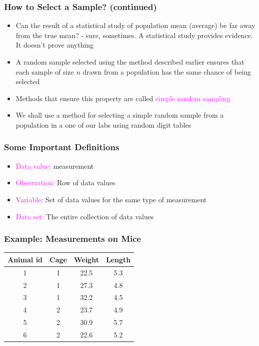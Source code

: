 \documentclass[xcolor=dvipsnames,12pt]{beamer}
\begin{document}
\begin{frame}
\frametitle{How to Select a Sample? (continued)}
\begin{itemize}
\item Can the result of a statistical study of population mean
(average) be far away from the true mean?  - sure, sometimes. 
A statistical study provides evidence.  It doesn't prove anything\\
\item A random sample selected using the method described earlier 
ensures that each sample of size $n$ drawn from a population has 
the same chance of being selected
\item Methods that ensure this property are called \textcolor{magenta}{simple  random 
sampling}
\item We shall use a method for selecting a simple  random 
sample from a population in a one of our labs using random digit tables
\end{itemize}
\end{frame}


\begin{frame}
\frametitle{Some Important Definitions}
\begin{itemize}
\item  \textcolor{magenta}{Data value:} measurement
\item \textcolor{magenta}{Observation:} Row of data values
\item \textcolor{magenta}{Variable:} Set of data values for the same type of measurement
\item \textcolor{magenta}{Data set:} The entire collection of data values
\end{itemize}
\end{frame}

\begin{frame}
\frametitle{Example: Measurements on Mice}
\begin{tabular}{|c|c|c|c|}
\hline
Animal id & Cage & Weight & Length \\ \hline
1  & 1  & 22.5  & 5.3  \\ \hline
2  & 1  & 27.3  & 4.8    \\ \hline
3  & 1  & 32.2  & 4.5   \\ \hline
4  & 2  & 23.7  & 4.9  \\\hline
5 & 2  & 30.9  & 5.7   \\ \hline
6  & 2  & 22.6  &5.2   \\ \hline
\end{tabular}
\end{frame}
\end{document}
